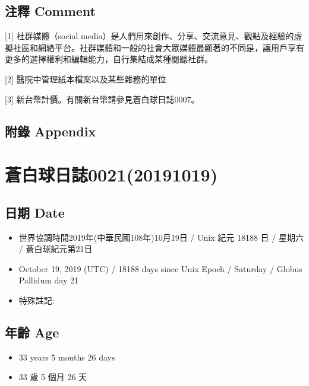 \documentclass[a5paper, 12pt
]{book}
\providecommand{\tightlist}{%
  \setlength{\itemsep}{0pt}\setlength{\parskip}{0pt}}
\begin{document}
\hypertarget{ux6ce8ux91cb-comment-13}{%
\subsection{注釋 Comment}\label{ux6ce8ux91cb-comment-13}}

{[}1{]} 社群媒體（social
media）是人們用來創作、分享、交流意見、觀點及經驗的虛擬社區和網絡平台。社群媒體和一般的社會大眾媒體最顯著的不同是，讓用戶享有更多的選擇權利和編輯能力，自行集結成某種閱聽社群。

{[}2{]} 醫院中管理紙本檔案以及某些雜務的單位

{[}3{]} 新台幣計價。有關新台幣請參見蒼白球日誌0007。

\hypertarget{ux9644ux9304-appendix-12}{%
\subsection{附錄 Appendix}\label{ux9644ux9304-appendix-12}}

\hypertarget{ux84bcux767dux7403ux65e5ux8a8c002120191019}{%
\section{蒼白球日誌0021(20191019)}\label{ux84bcux767dux7403ux65e5ux8a8c002120191019}}

\hypertarget{ux65e5ux671f-date-20}{%
\subsection{日期 Date}\label{ux65e5ux671f-date-20}}

\begin{itemize}
\tightlist
\item
  世界協調時間2019年(中華民國108年)10月19日 / Unix 紀元 18188 日 /
  星期六 / 蒼白球紀元第21日
\item
  October 19, 2019 (UTC) / 18188 days since Unix Epoch / Saturday /
  Globus Pallidum day 21
\item
  特殊註記:
\end{itemize}

\hypertarget{ux5e74ux9f61-age-20}{%
\subsection{年齡 Age}\label{ux5e74ux9f61-age-20}}

\begin{itemize}
\tightlist
\item
  33 years 5 months 26 days
\item
  33 歲 5 個月 26 天
\end{itemize}
\end{document}
